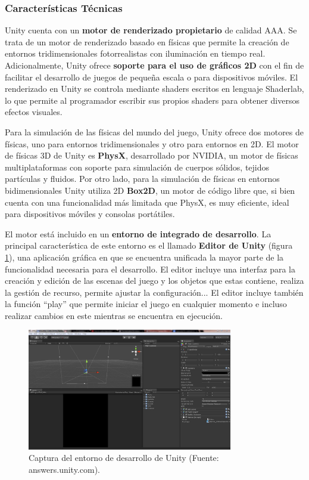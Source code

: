 \subsubsection{Características Técnicas}
Unity cuenta con un \textbf{motor de renderizado propietario} de calidad AAA. Se trata de un motor de renderizado basado en físicas que permite la creación de entornos tridimensionales fotorrealistas con iluminación en tiempo real. Adicionalmente, Unity ofrece \textbf{soporte para el uso de gráficos 2D} con el fin de facilitar el desarrollo de juegos de pequeña escala o para dispositivos móviles. El renderizado en Unity se controla mediante shaders escritos en lenguaje Shaderlab, lo que permite al programador escribir sus propios shaders para obtener diversos efectos visuales. 

Para la simulación de las físicas del mundo del juego, Unity ofrece dos motores de físicas, uno para entornos tridimensionales y otro para entornos en 2D. El motor de físicas 3D de Unity es \textbf{PhysX}, desarrollado por NVIDIA, un motor de físicas multiplataformas con soporte para simulación de cuerpos sólidos, tejidos partículas y fluidos. Por otro lado, para la simulación de físicas en entornos bidimensionales Unity utiliza 2D \textbf{Box2D}, un motor de código libre que, si bien cuenta con una funcionalidad más limitada que PhysX, es muy eficiente, ideal para dispositivos móviles y consolas portátiles.

El motor está incluido en un \textbf{entorno de integrado de desarrollo}. La principal característica de este entorno es el llamado \textbf{Editor de Unity} (figura \ref{captura-unity}), una aplicación gráfica en que se encuentra unificada la mayor parte de la funcionalidad necesaria para el desarrollo. El editor incluye una interfaz para la creación y edición de las escenas del juego y los objetos que estas contiene, realiza la gestión de recurso, permite ajustar la configuración... El editor incluye también la función ``play'' que permite iniciar el juego en cualquier momento e incluso realizar cambios en este mientras se encuentra en ejecución.
\begin{figure}[h]
	\includegraphics[width=0.8\textwidth]{images/estadodelarte/motores/captura-unity}
	\centering
	\caption{Captura del entorno de desarrollo de Unity (Fuente: answers.unity.com).}
	\label{captura-unity}
\end{figure}

